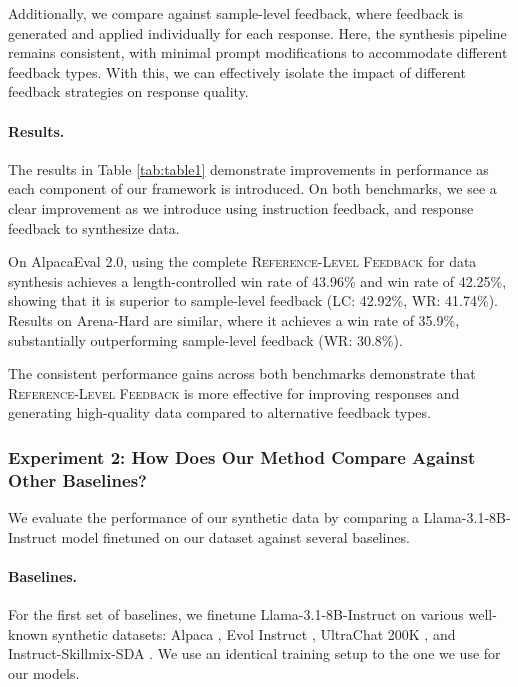 Additionally, we compare against sample-level feedback, where feedback is generated and applied individually for each response. Here, the synthesis pipeline remains consistent, with minimal prompt modifications to accommodate different feedback types. With this, we can effectively isolate the impact of different feedback strategies on response quality.

\paragraph{Results.}

The results in Table \ref{tab:table1} demonstrate improvements in performance as each component of our framework is introduced. On both benchmarks, we see a clear improvement as we introduce using instruction feedback, and response feedback to synthesize data.

On AlpacaEval 2.0, using the complete \textsc{Reference-Level Feedback} for data synthesis achieves a length-controlled win rate of 43.96\% and win rate of 42.25\%, showing that it is superior to sample-level feedback (LC: 42.92\%, WR: 41.74\%). Results on Arena-Hard are similar, where it achieves a win rate of 35.9\%, substantially outperforming sample-level feedback (WR: 30.8\%).

The consistent performance gains across both benchmarks demonstrate that \textsc{Reference-Level Feedback} is more effective for improving responses and generating high-quality data compared to alternative feedback types.

\subsubsection{Experiment 2: How Does Our Method Compare Against Other Baselines?} \label{sec:4.2.2}

We evaluate the performance of our synthetic data by comparing a Llama-3.1-8B-Instruct model finetuned on our dataset against several baselines.

\paragraph{Baselines.}
For the first set of baselines, we finetune Llama-3.1-8B-Instruct on various well-known synthetic datasets: Alpaca \citep{alpaca}, Evol Instruct \citep{xu2023wizardlmempoweringlargelanguage}, UltraChat 200K \citep{ding-etal-2023-enhancing}, and Instruct-Skillmix-SDA \citep{kaur2024instruct}. We use an identical training setup to the one we use for our models.

